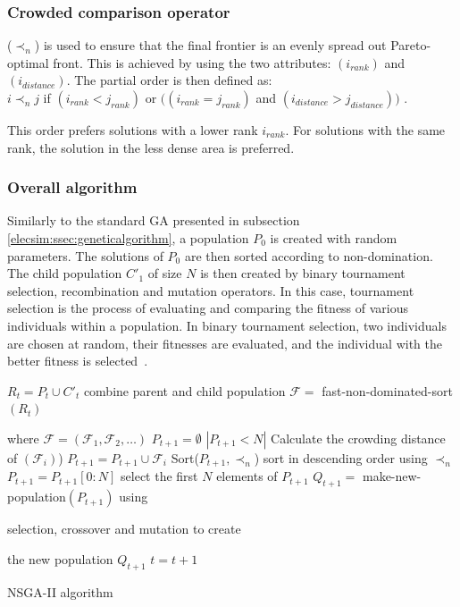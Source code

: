 \subsubsection{Crowded comparison operator}
($\prec_n$) is used to ensure that the final frontier is an evenly spread out Pareto-optimal front. This is achieved by using the two attributes: $(i_{rank})$ and$(i_{distance})$. 
The partial order is then defined as:\\    
$i\prec_nj$ if $(i_{rank}<j_{rank})$ or $((i_{rank}=j_{rank})$ and  $(i_{distance}>j_{distance}))$ \cite{Valkanas2014}.

This order prefers solutions with a lower rank $i_{rank}$. For solutions with the same rank, the solution in the less dense area is preferred.

\subsubsection{Overall algorithm}

Similarly to the standard GA presented in subsection \ref{elecsim:ssec:geneticalgorithm}, a population $P_{0}$ is created with random parameters. The solutions of $P_0$ are then sorted according to non-domination. The child population $C'_{1}$ of size $N$ is then created by binary tournament selection, recombination and mutation operators. In this case, tournament selection is the process of evaluating and comparing the fitness of various individuals within a population. In binary tournament selection, two individuals are chosen at random, their fitnesses are evaluated, and the individual with the better fitness is selected~\cite{AbdRahman2016}. 



\begin{algorithm}
	\begin{algorithmic}[1]
		\State $R_t=P_t \cup C'_t$ combine parent and child population
		\State $\mathcal{F} = $ fast-non-dominated-sort $(R_t)$ 
		
		where $\mathcal{F}=(\mathcal{F}_1, \mathcal{F}_2,\ldots)$
		\State $P_{t+1}=\emptyset$
		\While $\left|P_{t+1}<N\right|$
		\State Calculate the crowding distance of $(\mathcal{F}_i)$)
		\State $P_{t+1}=P_{t+1}\cup \mathcal{F}_i$
		\EndWhile
		\State Sort($P_{t+1}, \prec_n$) sort in descending order using $\prec_n$
		\State $P_{t+1} = P_{t+1}[0:N]$ select the first $N$ elements of $P_{t+1}$
		\State $Q_{t+1} = $ make-new-population$(P_{t+1})$ using 
		
		selection, crossover and mutation to create 
		
		the new population $Q_{t+1}$
		\State $t=t+1$
		\caption{NSGA-II algorithm \cite{Valkanas2014}}
		\label{algo:nsga2}
	\end{algorithmic}
\end{algorithm}


